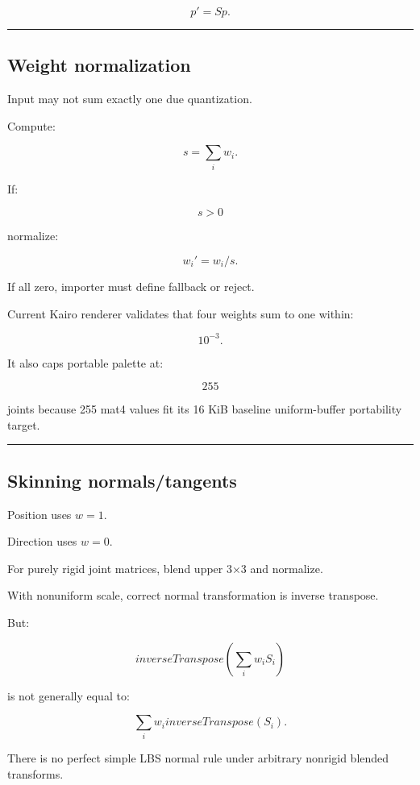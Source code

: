\[
p'=Sp.
\]

\begin{center}\rule{0.5\linewidth}{0.5pt}\end{center}

\subsection{Weight normalization}\label{04-visual-computing-ii-ch041-weight-normalization}

Input may not sum exactly one due quantization.

Compute:

\[
s=
\sum_iw_i.
\]

If:

\[
s>0
\]

normalize:

\[
w_i'=w_i/s.
\]

If all zero, importer must define fallback or reject.

Current Kairo renderer validates that four weights sum to one within:

\[
10^{-3}.
\]

It also caps portable palette at:

\[
255
\]

joints because 255 mat4 values fit its 16 KiB baseline uniform-buffer portability target.

\begin{center}\rule{0.5\linewidth}{0.5pt}\end{center}

\subsection{Skinning normals/tangents}\label{04-visual-computing-ii-ch041-skinning-normalstangents}

Position uses \(w=1\).

Direction uses \(w=0\).

For purely rigid joint matrices, blend upper 3×3 and normalize.

With nonuniform scale, correct normal transformation is inverse transpose.

But:

\[
inverseTranspose
\left(
\sum_iw_iS_i
\right)
\]

is not generally equal to:

\[
\sum_iw_i
inverseTranspose(S_i).
\]

There is no perfect simple LBS normal rule under arbitrary nonrigid blended transforms.

